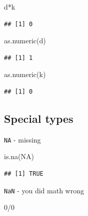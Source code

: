\documentclass[
]{book}
\newenvironment{Shaded}{\begin{snugshade}}{\end{snugshade}}
\newcommand{\ConstantTok}[1]{\textcolor[rgb]{0.00,0.00,0.00}{#1}}
\newcommand{\DecValTok}[1]{\textcolor[rgb]{0.00,0.00,0.81}{#1}}
\newcommand{\FunctionTok}[1]{\textcolor[rgb]{0.00,0.00,0.00}{#1}}
\newcommand{\NormalTok}[1]{#1}
\newcommand{\SpecialCharTok}[1]{\textcolor[rgb]{0.00,0.00,0.00}{#1}}
\begin{document}
\begin{Shaded}
\begin{Highlighting}[]
\NormalTok{d}\SpecialCharTok{*}\NormalTok{k}
\end{Highlighting}
\end{Shaded}

\begin{verbatim}
## [1] 0
\end{verbatim}

\begin{Shaded}
\begin{Highlighting}[]
\FunctionTok{as.numeric}\NormalTok{(d)}
\end{Highlighting}
\end{Shaded}

\begin{verbatim}
## [1] 1
\end{verbatim}

\begin{Shaded}
\begin{Highlighting}[]
\FunctionTok{as.numeric}\NormalTok{(k)}
\end{Highlighting}
\end{Shaded}

\begin{verbatim}
## [1] 0
\end{verbatim}

\hypertarget{special-types}{%
\subsection{Special types}\label{special-types}}

\texttt{NA} - missing

\begin{Shaded}
\begin{Highlighting}[]
\FunctionTok{is.na}\NormalTok{(}\ConstantTok{NA}\NormalTok{)}
\end{Highlighting}
\end{Shaded}

\begin{verbatim}
## [1] TRUE
\end{verbatim}

\texttt{NaN} - you did math wrong

\begin{Shaded}
\begin{Highlighting}[]
\DecValTok{0}\SpecialCharTok{/}\DecValTok{0}
\end{Highlighting}
\end{Shaded}
\end{document}
